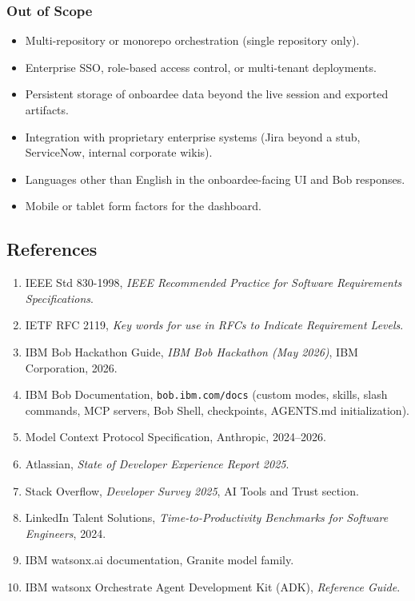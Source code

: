 \documentclass[11pt,letterpaper]{article}
\begin{document}
\subsubsection*{Out of Scope}

\begin{itemize}
  \item Multi-repository or monorepo orchestration (single repository only).
  \item Enterprise SSO, role-based access control, or multi-tenant deployments.
  \item Persistent storage of onboardee data beyond the live session and exported artifacts.
  \item Integration with proprietary enterprise systems (Jira beyond a stub, ServiceNow, internal corporate wikis).
  \item Languages other than English in the onboardee-facing UI and Bob responses.
  \item Mobile or tablet form factors for the dashboard.
\end{itemize}

\subsection{References}

\begin{enumerate}
  \item IEEE Std 830-1998, \textit{IEEE Recommended Practice for Software Requirements Specifications}.
  \item IETF RFC 2119, \textit{Key words for use in RFCs to Indicate Requirement Levels}.
  \item IBM Bob Hackathon Guide, \textit{IBM Bob Hackathon (May 2026)}, IBM Corporation, 2026.
  \item IBM Bob Documentation, \texttt{bob.ibm.com/docs} (custom modes, skills, slash commands, MCP servers, Bob Shell, checkpoints, AGENTS.md initialization).
  \item Model Context Protocol Specification, Anthropic, 2024--2026.
  \item Atlassian, \textit{State of Developer Experience Report 2025}.
  \item Stack Overflow, \textit{Developer Survey 2025}, AI Tools and Trust section.
  \item LinkedIn Talent Solutions, \textit{Time-to-Productivity Benchmarks for Software Engineers}, 2024.
  \item IBM watsonx.ai documentation, Granite model family.
  \item IBM watsonx Orchestrate Agent Development Kit (ADK), \textit{Reference Guide}.
\end{enumerate}
\end{document}
